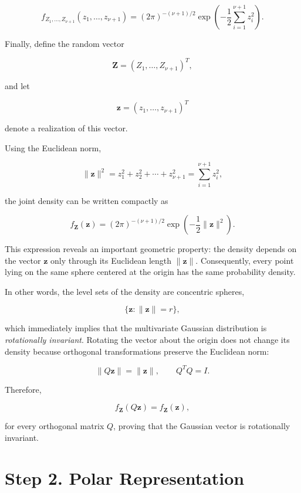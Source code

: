 \documentclass[11pt]{article}
\begin{document}
\begin{mdframed}[
		linewidth=0.8pt,
		roundcorner=6pt,
		backgroundcolor=gray!5,
		linecolor=gray!60,
		innertopmargin=10pt,
		innerbottommargin=10pt,
		innerleftmargin=10pt,
		innerrightmargin=10pt
		]
		\[
		f_{Z_1,\ldots,Z_{\nu+1}}
		(z_1,\ldots,z_{\nu+1})
		=
		(2\pi)^{-(\nu+1)/2}
		\exp\left(
		-\frac12
		\sum_{i=1}^{\nu+1}
		z_i^2
		\right).
		\]
		
		Finally, define the random vector
		
		\[
		\mathbf Z
		=
		(Z_1,\ldots,Z_{\nu+1})^T,
		\]
		
		and let
		
		\[
		\mathbf z
		=
		(z_1,\ldots,z_{\nu+1})^T
		\]
		
		denote a realization of this vector.
		
		Using the Euclidean norm,
		
		\[
		\|\mathbf z\|^2
		=
		z_1^2+z_2^2+\cdots+z_{\nu+1}^2
		=
		\sum_{i=1}^{\nu+1}z_i^2,
		\]
		
		the joint density can be written compactly as
		
		\[
		\boxed{
			f_{\mathbf Z}(\mathbf z)
			=
			(2\pi)^{-(\nu+1)/2}
			\exp\left(
			-\frac12
			\|\mathbf z\|^2
			\right).
		}
		\]
		
		This expression reveals an important geometric property: the density
		depends on the vector $\mathbf z$ only through its Euclidean length
		$\|\mathbf z\|$. Consequently, every point lying on the same sphere
		centered at the origin has the same probability density.
		
		In other words, the level sets of the density are concentric spheres,
		
		\[
		\{\mathbf z:\|\mathbf z\|=r\},
		\]
		
		which immediately implies that the multivariate Gaussian distribution is
		\emph{rotationally invariant}. Rotating the vector about the origin does
		not change its density because orthogonal transformations preserve the
		Euclidean norm:
		
		\[
		\|Q\mathbf z\|
		=
		\|\mathbf z\|,
		\qquad
		Q^TQ=I.
		\]
		
		Therefore,
		
		\[
		f_{\mathbf Z}(Q\mathbf z)
		=
		f_{\mathbf Z}(\mathbf z),
		\]
		
		for every orthogonal matrix \(Q\), proving that the Gaussian vector is
		rotationally invariant.
		
	\end{mdframed}
	
	
	\section{Step 2. Polar Representation}
	
\end{document}
